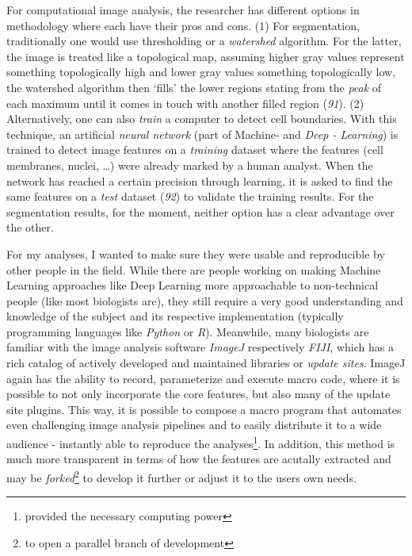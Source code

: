 \documentclass[10pt, b5paper, singlespacinge, twoside]{reedthesis} %
\theoremstyle{definition}
\theoremstyle{definition}
\theoremstyle{definition}
\theoremstyle{remark}
\begin{document}
For computational image analysis, the researcher has different options in methodology where each have their pros and cons. (1) For segmentation, traditionally one would use thresholding or a \emph{watershed} algorithm. For the latter, the image is treated like a topological map, assuming higher gray values represent something topologically high and lower gray values something topologically low, the watershed algorithm then `fills' the lower regions stating from the \emph{peak} of each maximum until it comes in touch with another filled region (\emph{91}). (2) Alternatively, one can also \emph{train} a computer to detect cell boundaries. With this technique, an artificial \emph{neural network} (part of Machine- and \emph{Deep - Learning}) is trained to detect image features on a \emph{training} dataset where the features (cell membranes, nuclei, \ldots) were already marked by a human analyst. When the network has reached a certain precision through learning, it is asked to find the same features on a \emph{test} dataset (\emph{92}) to validate the training results. For the segmentation results, for the moment, neither option has a clear advantage over the other.

For my analyses, I wanted to make sure they were usable and reproducible by other people in the field. While there are people working on making Machine Learning approaches like Deep Learning more approachable to non-technical people (like most biologists are), they still require a very good understanding and knowledge of the subject and its respective implementation (typically programming languages like \emph{Python} or \emph{R}). Meanwhile, many biologists are familiar with the image analysis software \emph{ImageJ} respectively \emph{FIJI}, which has a rich catalog of actively developed and maintained libraries or \emph{update sites}. ImageJ again has the ability to record, parameterize and execute macro code, where it is possible to not only incorporate the core features, but also many of the update site plugins. This way, it is possible to compose a macro program that automates even challenging image analysis pipelines and to easily distribute it to a wide audience - instantly able to reproduce the analyses\footnote{provided the necessary computing power}. In addition, this method is much more transparent in terms of how the features are acutally extracted and may be \emph{forked}\footnote{to open a parallel branch of development} to develop it further or adjust it to the users own needs.
\end{document}
